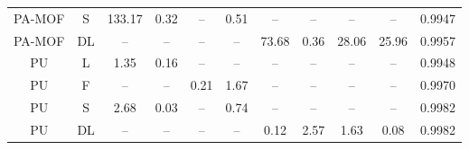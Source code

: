 \documentclass[journal=jacsat,manuscript=article]{achemso}
\begin{document}
\begin{table}[H]
\begin{tabular}{c | c | c c | c c | c c c c | c}
    PA-MOF  & S               &133.17      & 0.32  & --     & 0.51  & --           & --     & --           & --     & 0.9947  \\
    \rowcolor{lime!25} PA-MOF  & DL    & --         & --    & --     & --    & 73.68        & 0.36   & 28.06        & 25.96  & 0.9957  \\
    \hline
    PU     & L           &  1.35      & 0.16  & --     & --    & --           & --     & --           & --     & 0.9948  \\
    PU     & F         & --         & --    & 0.21   & 1.67  & --           & --     & --           & --     & 0.9970  \\
    \rowcolor{lime!25} PU     & S               &  2.68      & 0.03  & --     & 0.74  & --           & --     & --           & --     & 0.9982  \\
    PU     & DL    & --         & --    & --     & --    & 0.12         & 2.57   & 1.63         & 0.08   & 0.9982  \\
    \hline
  \end{tabular}
\end{table}
\end{document}
